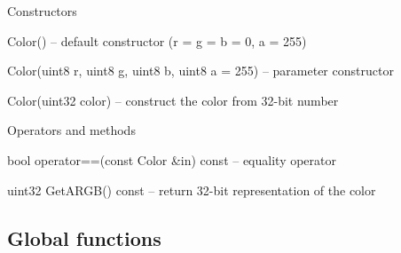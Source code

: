 \begin{titled-itemize}{Constructors}
  \item Color() -- default constructor (r = g = b = 0, a = 255)
  \item Color(uint8 r, uint8 g, uint8 b, uint8 a = 255) -- parameter constructor
  \item Color(uint32 color) -- construct the color from 32-bit number
\end{titled-itemize}

\begin{titled-itemize}{Operators and methods}
  \item bool operator==(const Color \&in) const -- equality operator
  \item uint32 GetARGB() const -- return 32-bit representation of the color
\end{titled-itemize}

\subsection{Global functions}

